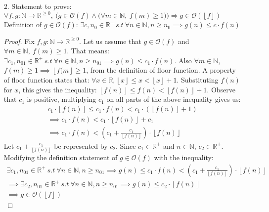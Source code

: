 \documentclass[11pt]{article}
\newcommand{\floor}[1]{\left\lfloor #1 \right\rfloor}
\begin{document}
\begin{enumerate}
\newpage

\item[2.] Statement to prove:
$
\forall f, g: \mathbb{N} \to \mathbb{R}^{\geq 0},~
\Big(g \in \mathcal{O}(f) \land \big(\forall m \in \mathbb{N},~ f(m) \geq 1) \Big) \Rightarrow
g \in \mathcal{O}(\floor{f})
$
\newline \newline \newline
Definition of $g \in \mathcal{O}(f)$: $\exists c, n_{0} \in \mathbb{R}^+ ~ s.t ~ \forall n \in \mathbb{N}, n \geq n_{0} \implies g(n) \leq c \cdot f(n)$
\begin{proof}
Fix $f, g: \mathbb{N} \to \mathbb{R}^{\geq 0}$. \newline
Let us assume that $g \in \mathcal{O}(f)$ and $\forall m \in \mathbb{N},~ f(m) \geq 1$. \newline
That means: $\exists c_{1}, n_{01} \in \mathbb{R}^+ ~ s.t ~ \forall n \in \mathbb{N}, n \geq n_{01} \implies g(n) \leq c_{1} \cdot f(n)$. \newline
Also $\forall m \in \mathbb{N}$, $f(m) \geq 1 \implies \floor{f(m} \geq 1$, from the definition of floor function. \newline
A property of floor function states that: $\forall x \in \mathbb{R}, \floor{x} \leq x < \floor{x} + 1$. \newline
Substituting $f(n)$ for $x$, this gives the inequality: $\floor{f(n)} \leq f(n) < \floor{f(n)} + 1$. \newline
Observe that $c_{1}$ is positive, multiplying $c_{1}$ on all parts of the above inequality gives us:
\begin{gather*}
c_{1} \cdot \floor{f(n)} \leq c_{1} \cdot f(n) < c_{1} \cdot (\floor{f(n)} + 1) \\
\implies c_{1} \cdot f(n) < c_{1} \cdot \floor{f(n)} + c_{1} \\
\implies c_{1} \cdot f(n) < (c_{1} + \frac{c_{1}}{\floor{f(n)}}) \cdot \floor{f(n)}
\end{gather*}
Let $c_{1} + \frac{c_{1}}{\floor{f(n)}}$ be represented by $c_{2}$. Since $c_{1} \in \mathbb{R}^+$ and $n \in \mathbb{N}$, $c_{2} \in \mathbb{R}^+$. \newline
Modifying the definition statement of $g \in \mathcal{O}(f)$ with the inequality:
\begin{gather*}
\exists c_{1}, n_{01} \in \mathbb{R}^+ ~ s.t ~ \forall n \in \mathbb{N}, n \geq n_{01} \implies g(n) \leq c_{1} \cdot f(n) < (c_{1} + \frac{c_{1}}{\floor{f(n)}}) \cdot \floor{f(n)} \\
\implies \exists c_{2}, n_{01} \in \mathbb{R}^+ ~ s.t ~ \forall n \in \mathbb{N}, n \geq n_{01} \implies g(n) \leq c_{2} \cdot \floor{f(n)} \\
\implies g \in \mathcal{O}(\floor{f})
\end{gather*}
\end{proof}
\end{enumerate}
\end{document}
